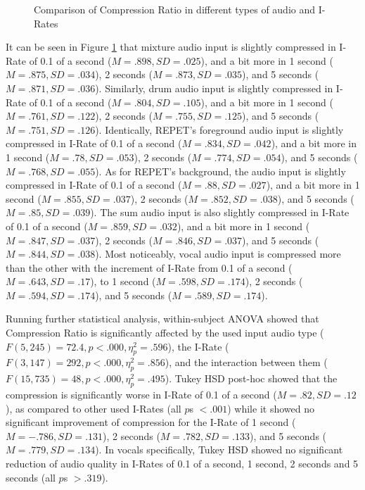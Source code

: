 \begin{figure}[ht]
  
  \caption{Comparison of Compression Ratio in different types of audio and I-Rates}
  \label{fig:irate-compression-ratio}
\end{figure}

It can be seen in Figure \ref{fig:irate-compression-ratio} that mixture audio input is slightly compressed in I-Rate of 0.1 of a second ($M=.898, SD=.025$), and a bit more in 1 second ($M=.875, SD=.034$), 2 seconds ($M=.873, SD=.035$), and 5 seconds ($M=.871, SD=.036$).
Similarly, drum audio input is slightly compressed in I-Rate of 0.1 of a second ($M=.804, SD=.105$), and a bit more in 1 second ($M=.761, SD=.122$), 2 seconds ($M=.755, SD=.125$), and 5 seconds ($M=.751, SD=.126$). 
Identically, REPET's foreground audio input is slightly compressed in I-Rate of 0.1 of a second ($M=.834, SD=.042$), and a bit more in 1 second ($M=.78, SD=.053$), 2 seconds ($M=.774, SD=.054$), and 5 seconds ($M=.768, SD=.055$).
As for REPET's background, the audio input is slightly compressed in I-Rate of 0.1 of a second ($M=.88, SD=.027$), and a bit more in 1 second ($M=.855, SD=.037$), 2 seconds ($M=.852, SD=.038$), and 5 seconds ($M=.85, SD=.039$).
The sum audio input is also slightly compressed in I-Rate of 0.1 of a second ($M=.859, SD=.032$), and a bit more in 1 second ($M=.847, SD=.037$), 2 seconds ($M=.846, SD=.037$), and 5 seconds ($M=.844, SD=.038$).
Most noticeably, vocal audio input is compressed more than the other with the increment of I-Rate from 0.1 of a second ($M=.643, SD=.17$), to 1 second ($M=.598, SD=.174$), 2 seconds ($M=.594, SD=.174$), and 5 seconds ($M=.589, SD=.174$).

Running further statistical analysis,  within-subject ANOVA showed that Compression Ratio is significantly affected by the used input audio type ($F(5,245)=72.4, p<.000, \eta_{p}^{2}=.596$), the I-Rate ($F(3,147)=292, p<.000, \eta_{p}^{2}=.856$), and the interaction between them ($F(15,735)=48, p<.000, \eta_{p}^{2}=.495$).
Tukey HSD post-hoc showed that the compression is significantly worse in I-Rate of 0.1 of a second ($M=.82, SD=.12$), as compared to other used I-Rates (all $p$s $<.001$) while it showed no significant improvement of compression for the I-Rate of 1 second ($M=-.786, SD=.131$), 2 seconds ($M=.782, SD=.133$), and 5 seconds ($M=.779, SD=.134$). 
In vocals specifically, Tukey HSD showed no significant reduction of audio quality in I-Rates of 0.1 of a second, 1 second, 2 seconds and 5 seconds (all $p$s $>.319$).

